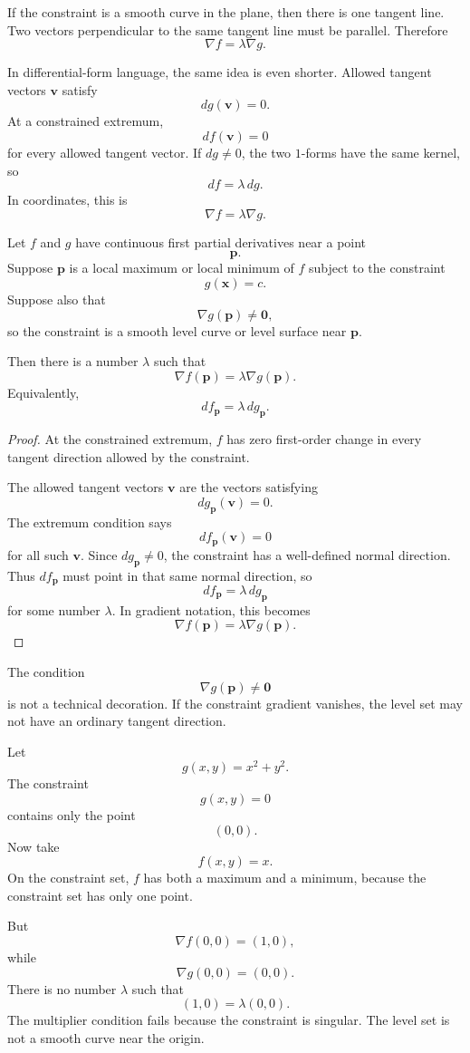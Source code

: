 If the constraint is a smooth curve in the plane, then there is one tangent line.  Two
vectors perpendicular to the same tangent line must be parallel.  Therefore
\[
    \nabla f=\lambda\nabla g.
\]

In differential-form language, the same idea is even shorter.  Allowed tangent vectors
\(\mathbf v\) satisfy
\[
    dg(\mathbf v)=0.
\]
At a constrained extremum,
\[
    df(\mathbf v)=0
\]
for every allowed tangent vector.  If \(dg\ne0\), the two \(1\)-forms have the same
kernel, so
\[
\boxed{
    df=\lambda\,dg.
}
\]
In coordinates, this is
\[
\boxed{
    \nabla f=\lambda\nabla g.
}
\]

\begin{theorem}
Let \(f\) and \(g\) have continuous first partial derivatives near a point
\[
    \mathbf p.
\]
Suppose \(\mathbf p\) is a local maximum or local minimum of \(f\) subject to the
constraint
\[
    g(\mathbf x)=c.
\]
Suppose also that
\[
    \nabla g(\mathbf p)\ne\mathbf 0,
\]
so the constraint is a smooth level curve or level surface near \(\mathbf p\).

Then there is a number \(\lambda\) such that
\[
\boxed{
    \nabla f(\mathbf p)=\lambda\nabla g(\mathbf p).
}
\]
Equivalently,
\[
\boxed{
    df_{\mathbf p}=\lambda\,dg_{\mathbf p}.
}
\]
\end{theorem}

\begin{proof}
At the constrained extremum, \(f\) has zero first-order change in every tangent
direction allowed by the constraint.

The allowed tangent vectors \(\mathbf v\) are the vectors satisfying
\[
    dg_{\mathbf p}(\mathbf v)=0.
\]
The extremum condition says
\[
    df_{\mathbf p}(\mathbf v)=0
\]
for all such \(\mathbf v\).  Since \(dg_{\mathbf p}\ne0\), the constraint has a well-defined
normal direction.  Thus \(df_{\mathbf p}\) must point in that same normal direction,
so
\[
    df_{\mathbf p}=\lambda\,dg_{\mathbf p}
\]
for some number \(\lambda\).  In gradient notation, this becomes
\[
    \nabla f(\mathbf p)=\lambda\nabla g(\mathbf p).
\]
\end{proof}

The condition
\[
    \nabla g(\mathbf p)\ne\mathbf 0
\]
is not a technical decoration.  If the constraint gradient vanishes, the level set may
not have an ordinary tangent direction.

\begin{example}
Let
\[
    g(x,y)=x^2+y^2.
\]
The constraint
\[
    g(x,y)=0
\]
contains only the point
\[
    (0,0).
\]
Now take
\[
    f(x,y)=x.
\]
On the constraint set, \(f\) has both a maximum and a minimum, because the constraint
set has only one point.

But
\[
    \nabla f(0,0)=(1,0),
\]
while
\[
    \nabla g(0,0)=(0,0).
\]
There is no number \(\lambda\) such that
\[
    (1,0)=\lambda(0,0).
\]
The multiplier condition fails because the constraint is singular.  The level set is not
a smooth curve near the origin.
\end{example}

